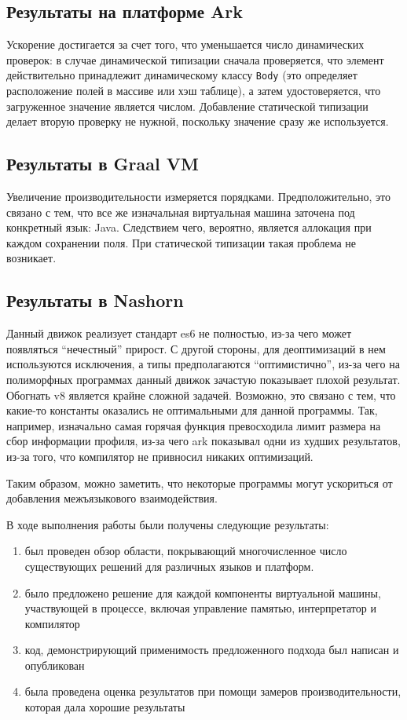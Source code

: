 \documentclass[times,specification,annotation]{itmo-student-thesis}
\begin{document}
\subsection{Результаты на платформе Ark}
Ускорение достигается за счет того, что уменьшается число динамических проверок: в случае динамической типизации сначала проверяется, что элемент действительно принадлежит динамическому классу \texttt{Body} (это определяет расположение полей в массиве или хэш таблице), а затем удостоверяется, что загруженное значение является числом. Добавление статической типизации делает вторую проверку не нужной, поскольку значение сразу же используется.
\subsection{Результаты в Graal VM}
Увеличение производительности измеряется порядками. Предположительно, это связано с тем, что все же изначальная виртуальная машина заточена под конкретный язык: Java. Следствием чего, вероятно, является аллокация при каждом сохранении поля. При статической типизации такая проблема не возникает.
\subsection{Результаты в Nashorn}
Данный движок реализует стандарт es6 не полностью, из-за чего может появляться ``нечестный'' прирост. С другой стороны, для деоптимизаций в нем используются исключения, а типы предполагаются ``оптимистично'', из-за чего на полиморфных программах данный движок зачастую показывает плохой результат.\\
Обогнать v8 является крайне сложной задачей. Возможно, это связано с тем, что какие-то константы оказались не оптимальными для данной программы. Так, например, изначально самая горячая функция превосходила лимит размера на сбор информации профиля, из-за чего ark показывал одни из худших результатов, из-за того, что компилятор не привносил никаких оптимизаций.

\chapterconclusion

Таким образом, можно заметить, что некоторые программы могут ускориться от добавления межъязыкового взаимодействия.

\startconclusionpage
В ходе выполнения работы были получены следующие результаты:
\begin{enumerate}
	\item был проведен обзор области, покрывающий многочисленное число существующих решений для различных языков и платформ.
	\item было предложено решение для каждой компоненты виртуальной машины, участвующей в процессе, включая управление памятью, интерпретатор и компилятор
	\item код, демонстрирующий применимость предложенного подхода был написан и опубликован
	\item была проведена оценка результатов при помощи замеров производительности, которая дала хорошие результаты
\end{enumerate}
\end{document}
